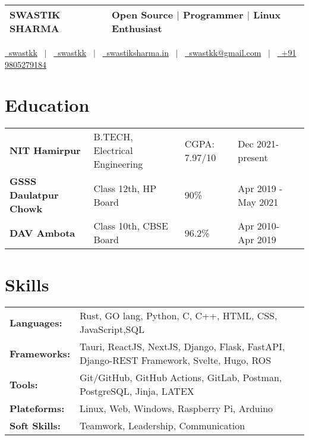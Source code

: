 \documentclass[legalpaper,11pt]{article}
\begin{document}
\pagestyle{empty} 


\begin{tabularx}{\linewidth}{@{} l X @{}}
\Huge{SWASTIK SHARMA} & \small{Open Source $|$ Programmer $|$ Linux Enthusiast} \\[6pt]
\hline %
\end{tabularx}

\begin{flushleft}
\href{https://github.com/swastkk}{\raisebox{-0.05\height}\faGithub\ swastkk} \ $|$ \ 
\href{https://linkedin.com/in/swastkk}{\raisebox{-0.05\height}\faLinkedin\ swastkk} \ $|$ \ 
\href{https://swastiksharma.in}{\raisebox{-0.05\height}\faGlobe \ swastiksharma.in} \ $|$ \ 
\href{mailto:swastkk@gmail.com}{\raisebox{-0.05\height}\faEnvelope \ swastkk@gmail.com} \ $|$ \ 
\href{tel:+91 9805279184}{\raisebox{-0.05\height}\faMobile \ +91 9805279184} \\
\end{flushleft}


\section{Education}

\begin{tabular}{lllll}
\textbf{NIT Hamirpur}         & B.TECH, Electrical Engineering & CGPA: 7.97/10 & Dec 2021- present   &  \\
\textbf{GSSS Daulatpur Chowk} & Class 12th, HP Board           & 90\%          & Apr 2019 - May 2021 &  \\
\textbf{DAV Ambota}           & Class 10th, CBSE Board         & 96.2\%        & Apr 2010- Apr 2019  &  \\
                                  
\end{tabular}

\section{Skills}
\begin{tabularx}{\linewidth}{@{}l X@{}}
\textbf{Languages:} &  \normalsize{Rust, GO lang, Python, C, C++, HTML, CSS, JavaScript,SQL}\\
\textbf{Frameworks:}  &  \normalsize{Tauri, ReactJS, NextJS, Django, Flask, FastAPI, Django-REST Framework, Svelte, Hugo, ROS}\\  
\textbf{Tools:} &  \normalsize{Git/GitHub, GitHub Actions, GitLab, Postman, PostgreSQL, Jinja, LATEX} \\
\textbf{Plateforms:} &  \normalsize{Linux, Web, Windows, Raspberry Pi, Arduino}\\
\textbf{Soft Skills:} &  \normalsize{Teamwork, Leadership, Communication}\\
\end{tabularx}
\end{document}
